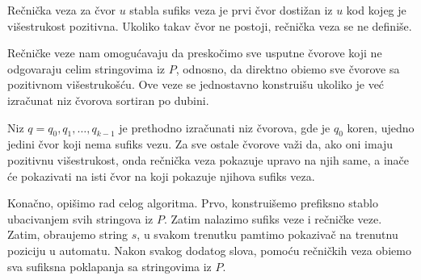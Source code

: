 \begin{dfn}
Re\v cni\v cka veza za \v cvor $u$ stabla sufiks veza je prvi \v cvor dosti\v zan iz $u$ kod kojeg je vi\v sestrukost pozitivna. Ukoliko takav \v cvor ne postoji, re\v cni\v cka veza se ne defini\v se.
\end{dfn}

Re\v cni\v cke veze nam omogu\' cavaju da presko\v cimo sve usputne \v cvorove koji ne odgovaraju celim stringovima iz $P$, odnosno, da direktno obi\dj emo sve \v cvorove sa pozitivnom vi\v sestruko\v s\' cu. Ove veze se jednostavno konstrui\v su ukoliko je ve\' c izra\v cunat niz \v cvorova sortiran po dubini.

\noindent
\begin{minipage}[l]{\textwidth}

\end{minipage}

Niz $q = q_0, q_1, \ldots, q_{k-1}$ je prethodno izra\v cunati niz \v cvorova, gde je $q_0$ koren, ujedno jedini \v cvor koji nema sufiks vezu. Za sve ostale \v cvorove va\v zi da, ako oni imaju pozitivnu vi\v sestrukost, onda re\v cni\v cka veza pokazuje upravo na njih same, a ina\v ce \' ce pokazivati na isti \v cvor na koji pokazuje njihova sufiks veza.

Kona\v cno, opi\v simo rad celog algoritma. Prvo, konstrui\v semo prefiksno stablo ubacivanjem svih stringova iz $P$. Zatim nalazimo sufiks veze i re\v cni\v cke veze. Zatim, obra\dj ujemo string $s$, u svakom trenutku pamtimo pokaziva\v c na trenutnu poziciju u automatu. Nakon svakog dodatog slova, pomo\' cu re\v cni\v ckih veza obi\dj emo sva sufiksna poklapanja sa stringovima iz $P$.

\noindent
\begin{minipage}[l]{\textwidth}

\end{minipage}

